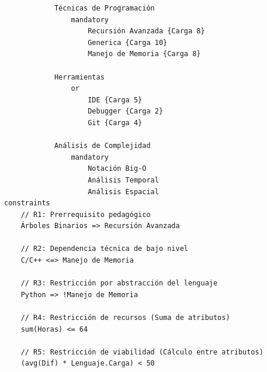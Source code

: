 \begin{lstlisting}
            Técnicas de Programación
                mandatory
                    Recursión Avanzada {Carga 8}
                    Generica {Carga 10}
                    Manejo de Memoria {Carga 8}
            
            Herramientas
                or
                    IDE {Carga 5}
                    Debugger {Carga 2}
                    Git {Carga 4}
            
            Análisis de Complejidad
                mandatory
                    Notación Big-O
                    Análisis Temporal
                    Análisis Espacial
constraints
    // R1: Prerrequisito pedagógico
    Árboles Binarios => Recursión Avanzada
    
    // R2: Dependencia técnica de bajo nivel
    C/C++ <=> Manejo de Memoria
    
    // R3: Restricción por abstracción del lenguaje
    Python => !Manejo de Memoria
    
    // R4: Restricción de recursos (Suma de atributos)
    sum(Horas) <= 64
    
    // R5: Restricción de viabilidad (Cálculo entre atributos)
    (avg(Dif) * Lenguaje.Carga) < 50
\end{lstlisting}

